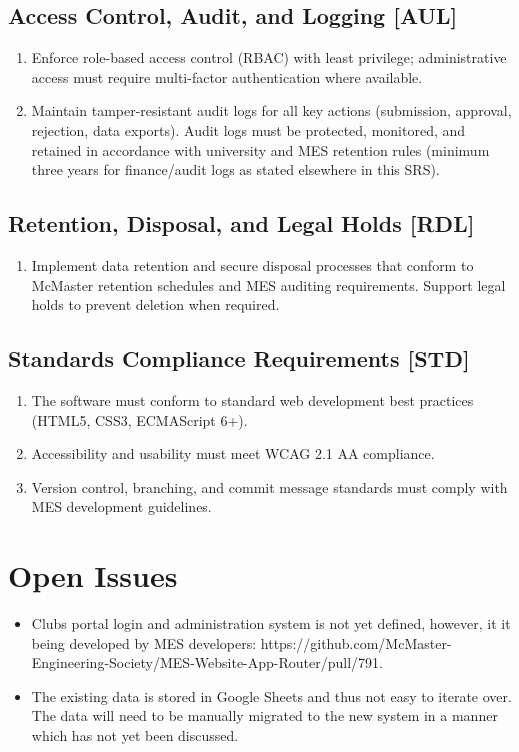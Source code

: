 \documentclass[12pt]{article}
\begin{document}
\subsection{Access Control, Audit, and Logging [AUL]}
\begin{enumerate}
  \item Enforce role-based access control (RBAC) with least privilege; administrative access must require multi-factor authentication where available.
  \item Maintain tamper-resistant audit logs for all key actions (submission, approval, rejection, data exports). Audit logs must be protected, monitored, and retained in accordance with university and MES retention rules (minimum three years for finance/audit logs as stated elsewhere in this SRS).
\end{enumerate}

\subsection{Retention, Disposal, and Legal Holds [RDL]}
\begin{enumerate}
  \item Implement data retention and secure disposal processes that conform to McMaster retention schedules and MES auditing requirements. Support legal holds to prevent deletion when required.
\end{enumerate}

\subsection{Standards Compliance Requirements [STD]}
\begin{enumerate}
    \item The software must conform to standard web development best practices (HTML5, CSS3, ECMAScript 6+).
    \item Accessibility and usability must meet WCAG 2.1 AA compliance.
    \item Version control, branching, and commit message standards must comply with MES development guidelines.
\end{enumerate}


\section{Open Issues}
  \begin{itemize}
    \item Clubs portal login and administration system is not yet defined, however, it it being developed by MES developers: https://github.com/McMaster-Engineering-Society/MES-Website-App-Router/pull/791.
    \item The existing data is stored in Google Sheets and thus not easy to iterate over. The data will need to be manually migrated to the new system in a manner which has not yet been discussed.
  \end{itemize}
\end{document}
